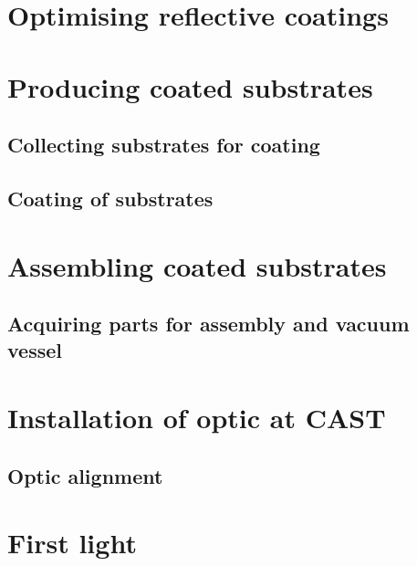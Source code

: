 \section{Optimising reflective coatings}
\section{Producing coated substrates}
\subsection{Collecting substrates for coating}
\subsection{Coating of substrates}
\section{Assembling coated substrates}
\subsection{Acquiring parts for assembly and vacuum vessel}
\section{Installation of optic at CAST}
\subsection{Optic alignment}
\section{First light}
